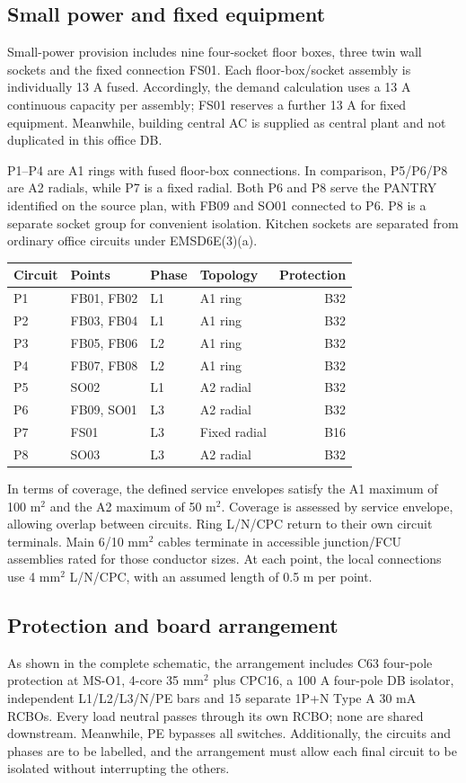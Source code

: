 \subsection*{Small power and fixed equipment}
Small-power provision includes nine four-socket floor boxes, three twin wall sockets and the fixed connection FS01. Each floor-box/socket assembly is individually 13 A fused. Accordingly, the demand calculation uses a 13 A continuous capacity per assembly; FS01 reserves a further 13 A for fixed equipment. Meanwhile, building central AC is supplied as central plant and not duplicated in this office DB.

P1--P4 are A1 rings with fused floor-box connections. In comparison, P5/P6/P8 are A2 radials, while P7 is a fixed radial. Both P6 and P8 serve the PANTRY identified on the source plan, with FB09 and SO01 connected to P6. P8 is a separate socket group for convenient isolation. Kitchen sockets are separated from ordinary office circuits under EMSD6E(3)(a).
\begin{center}\begin{tabular}{llllr}\toprule
Circuit & Points & Phase & Topology & Protection\\\midrule

P1 & FB01, FB02 & L1 & A1 ring & B32 \\
P2 & FB03, FB04 & L1 & A1 ring & B32 \\
P3 & FB05, FB06 & L2 & A1 ring & B32 \\
P4 & FB07, FB08 & L2 & A1 ring & B32 \\
P5 & SO02 & L1 & A2 radial & B32 \\
P6 & FB09, SO01 & L3 & A2 radial & B32 \\
P7 & FS01 & L3 & Fixed radial & B16 \\
P8 & SO03 & L3 & A2 radial & B32 \\

\bottomrule\end{tabular}\end{center}
In terms of coverage, the defined service envelopes satisfy the A1 maximum of 100 m$^2$ and the A2 maximum of 50 m$^2$. Coverage is assessed by service envelope, allowing overlap between circuits. Ring L/N/CPC return to their own circuit terminals. Main 6/10 mm$^2$ cables terminate in accessible junction/FCU assemblies rated for those conductor sizes. At each point, the local connections use 4 mm$^2$ L/N/CPC, with an assumed length of 0.5 m per point.
\clearpage

\subsection*{Protection and board arrangement}
As shown in the complete schematic, the arrangement includes C63 four-pole protection at MS-O1, 4-core 35 mm$^2$ plus CPC16, a 100 A four-pole DB isolator, independent L1/L2/L3/N/PE bars and 15 separate 1P+N Type A 30 mA RCBOs. Every load neutral passes through its own RCBO;  none are shared downstream. Meanwhile, PE bypasses all switches. Additionally, the circuits and phases are to be labelled, and the arrangement must allow each final circuit to be isolated without interrupting the others.

